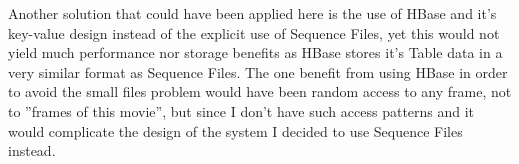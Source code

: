 Another solution that could have been applied here is the use of HBase and it's key-value design instead of the explicit use of Sequence Files, yet this would not yield much performance nor storage benefits as HBase stores it's Table data in a very similar format as Sequence Files. The one benefit from using HBase in order to avoid the small files problem would have been random access to any frame, not to ''frames of this movie'', but since I don't have such access patterns and it would complicate the design of the system I decided to use Sequence Files instead.






